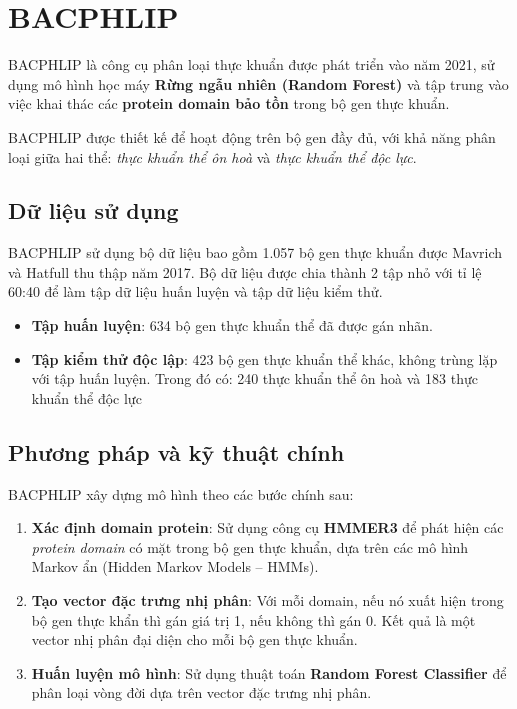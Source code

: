 \section{BACPHLIP}

BACPHLIP \cite{hockenberry2021bacphlip} là công cụ phân loại thực khuẩn được phát triển vào năm 2021, sử dụng mô hình học máy \textbf{Rừng ngẫu nhiên (Random Forest)} và tập trung vào việc khai thác các \textbf{protein domain bảo tồn} trong bộ gen thực khuẩn. 

BACPHLIP được thiết kế để hoạt động trên bộ gen đầy đủ, với khả năng phân loại giữa hai thể: \textit{thực khuẩn thể ôn hoà} và \textit{thực khuẩn thể độc lực}.

\subsection*{Dữ liệu sử dụng}
BACPHLIP sử dụng bộ dữ liệu bao gồm 1.057 bộ gen thực khuẩn được Mavrich và Hatfull thu thập năm 2017. Bộ dữ liệu được chia thành 2 tập nhỏ với tỉ lệ 60:40 để làm tập dữ liệu huấn luyện và tập dữ liệu kiểm thử. 
\begin{itemize}
    \item \textbf{Tập huấn luyện}: 634 bộ gen thực khuẩn thể đã được gán nhãn.
    \item \textbf{Tập kiểm thử độc lập}: 423 bộ gen thực khuẩn thể khác, không trùng lặp với tập huấn luyện. Trong đó có: 240 thực khuẩn thể ôn hoà và 183 thực khuẩn thể độc lực
\end{itemize}

\subsection*{Phương pháp và kỹ thuật chính}

BACPHLIP xây dựng mô hình theo các bước chính sau:

\begin{enumerate}
    \item \textbf{Xác định domain protein}: Sử dụng công cụ \textbf{HMMER3} để phát hiện các \textit{protein domain} có mặt trong bộ gen thực khuẩn, dựa trên các mô hình Markov ẩn (Hidden Markov Models – HMMs).
    
    \item \textbf{Tạo vector đặc trưng nhị phân}: Với mỗi domain, nếu nó xuất hiện trong bộ gen thực khẩn thì gán giá trị 1, nếu không thì gán 0. Kết quả là một vector nhị phân đại diện cho mỗi bộ gen thực khuẩn.
    
    \item \textbf{Huấn luyện mô hình}: Sử dụng thuật toán \textbf{Random Forest Classifier} để phân loại vòng đời dựa trên vector đặc trưng nhị phân.
\end{enumerate}

